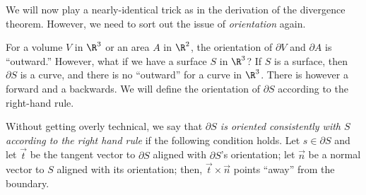 We will 
now play a nearly-identical trick as in the derivation of the divergence theorem.  However,
we need to sort out the issue of \emph{orientation} again.

For a volume $V$ in $\R^3$ or an area $A$ in $\R^2$, the orientation
of $\partial V$ and $\partial A$ is ``outward.''  However, what if we have
a surface $S$ in $\R^3$?  If $S$ is a surface, then $\partial S$ is
a curve, and there is no ``outward'' for a curve in $\R^3$.  There is
however a forward and a backwards.  We will define the orientation
of $\partial S$ according to the right-hand rule.

Without getting overly technical, we say that \emph{$\partial S$ is oriented
consistently with $S$ according to the right hand rule} if the following condition
holds.  Let $s\in\partial S$ and let $\vec t$ be the tangent vector to $\partial S$
aligned with $\partial S$'s orientation; let $\vec n$ be a normal vector to $S$ aligned
with its orientation; then, $\vec t\times \vec n$ points ``away'' from the boundary.

